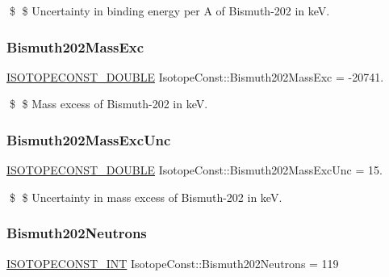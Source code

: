 \$ \$ Uncertainty in binding energy per A of Bismuth-\/202 in keV. \mbox{\label{group___isotope_const-_bismuth-_bi202_gaf16d0c6fffca051a97b789d8e0b8906a}} 
\subsubsection{\texorpdfstring{Bismuth202\+Mass\+Exc}{Bismuth202MassExc}}
{\footnotesize\ttfamily \mbox{\hyperlink{group___isotope_const-_macros_ga8f45a7272ce02c0b4c65c44636ed719a}{I\+S\+O\+T\+O\+P\+E\+C\+O\+N\+S\+T\+\_\+\+D\+O\+U\+B\+LE}} Isotope\+Const\+::\+Bismuth202\+Mass\+Exc = -\/20741.}

\$ \$ Mass excess of Bismuth-\/202 in keV. \mbox{\label{group___isotope_const-_bismuth-_bi202_ga16e8d1099130f6627fdd1611388612e1}} 
\subsubsection{\texorpdfstring{Bismuth202\+Mass\+Exc\+Unc}{Bismuth202MassExcUnc}}
{\footnotesize\ttfamily \mbox{\hyperlink{group___isotope_const-_macros_ga8f45a7272ce02c0b4c65c44636ed719a}{I\+S\+O\+T\+O\+P\+E\+C\+O\+N\+S\+T\+\_\+\+D\+O\+U\+B\+LE}} Isotope\+Const\+::\+Bismuth202\+Mass\+Exc\+Unc = 15.}

\$ \$ Uncertainty in mass excess of Bismuth-\/202 in keV. \mbox{\label{group___isotope_const-_bismuth-_bi202_ga0807b11eb6ae456fd50937543369301f}} 
\subsubsection{\texorpdfstring{Bismuth202\+Neutrons}{Bismuth202Neutrons}}
{\footnotesize\ttfamily \mbox{\hyperlink{group___isotope_const-_macros_ga5f18360b3e99483a35c32d789e62621c}{I\+S\+O\+T\+O\+P\+E\+C\+O\+N\+S\+T\+\_\+\+I\+NT}} Isotope\+Const\+::\+Bismuth202\+Neutrons = 119}


